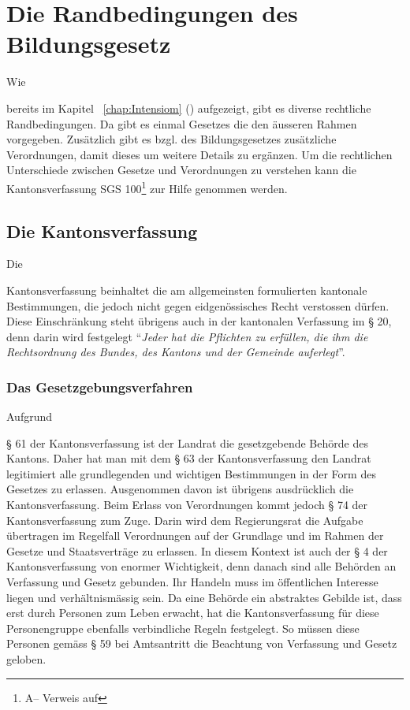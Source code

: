 \documentclass[10pt,parskip]{scrbook}
\newcounter{rz}
\newcommand{\Rz}{\addtocounter{rz}{1}\marginpar{\texttt{\textit{A\arabic{rz}}}}}
\newif\ifFooterInfo
\newcommand{\GNorm}[3]{#1 #2\ifFooterInfo\footnote{A\therz -- Verweis auf \ifstrempty{#3}{\citefield{#1#2}{title}}{\citefield{#1#3}{title}}}}
\begin{document}
\chapter{Die Randbedingungen des Bildungsgesetz}
Wie \Rz bereits im Kapitel ~\ref{chap:Intensiom} () aufgezeigt, gibt es diverse rechtliche Randbedingungen. Da gibt es einmal Gesetzes die den äusseren Rahmen vorgegeben. Zusätzlich gibt es bzgl. des Bildungsgesetzes zusätzliche Verordnungen, damit dieses um weitere Details zu ergänzen. Um die rechtlichen Unterschiede zwischen Gesetze und Verordnungen zu verstehen kann die Kantonsverfassung \GNorm{SGS}{100}{} zur Hilfe genommen werden. 

\section{Die Kantonsverfassung}\label{chap:Kantonsverfassung}
Die \Rz Kantonsverfassung beinhaltet die am allgemeinsten formulierten kantonale Bestimmungen, die jedoch nicht gegen eidgenössisches Recht verstossen dürfen. Diese Einschränkung steht übrigens auch in der kantonalen Verfassung im § 20, denn darin wird festgelegt "`\textsl{Jeder hat die Pflichten zu erfüllen, die ihm die Rechtsordnung des Bundes, des Kantons und der Gemeinde auferlegt}"'.\\

\subsection{Das Gesetzgebungsverfahren}\label{chap:Gesetzgebungsverfahren}
Aufgrund \Rz § 61 der Kantonsverfassung ist der Landrat die gesetzgebende Behörde des Kantons. Daher hat man mit dem § 63 der Kantonsverfassung den Landrat legitimiert alle grundlegenden und wichtigen Bestimmungen in der Form des Gesetzes zu erlassen. Ausgenommen davon ist übrigens ausdrücklich die Kantonsverfassung. Beim Erlass von Verordnungen kommt jedoch § 74 der Kantonsverfassung zum Zuge. Darin wird dem Regierungsrat die Aufgabe übertragen im Regelfall Verordnungen auf der Grundlage und im Rahmen der Gesetze und Staatsverträge zu erlassen. In diesem Kontext ist auch der § 4 der Kantonsverfassung von enormer Wichtigkeit, denn danach sind alle Behörden an Verfassung und Gesetz gebunden. Ihr Handeln muss im öffentlichen Interesse liegen und verhältnismässig sein. Da eine Behörde ein abstraktes Gebilde ist, dass erst durch Personen zum Leben erwacht, hat die Kantonsverfassung für diese Personengruppe ebenfalls verbindliche Regeln festgelegt. So müssen diese Personen gemäss § 59 bei Amtsantritt die Beachtung von Verfassung und Gesetz geloben.\\ 
\end{document}
